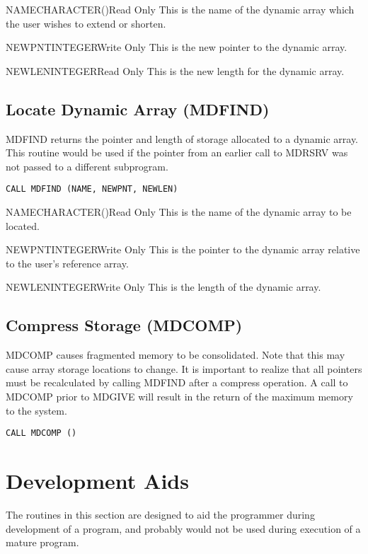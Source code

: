 \begin{argy}{NAME}{CHARACTER\last(\last)}{Read Only}
This is the name of the dynamic array which the user wishes to extend or
shorten. 
\end{argy}

\begin{argy}{NEWPNT}{INTEGER}{Write Only}
This is the new pointer to the dynamic array.
\end{argy}

\begin{argy}{NEWLEN}{INTEGER}{Read Only}
This is the new length for the dynamic array.
\end{argy}

\subsection{Locate Dynamic Array (MDFIND)}
MDFIND returns the pointer and length of storage allocated to a dynamic
array.  This routine would be used if the pointer from an earlier call to
MDRSRV was not passed to a different subprogram.

\verb+CALL MDFIND (NAME, NEWPNT, NEWLEN)+

\begin{argy}{NAME}{CHARACTER\last(\last)}{Read Only}
This is the name of the dynamic array to be located.
\end{argy}

\begin{argy}{NEWPNT}{INTEGER}{Write Only}
This is the pointer to the dynamic array relative to the user's reference
array. 
\end{argy}

\begin{argy}{NEWLEN}{INTEGER}{Write Only}
This is the length of the dynamic array.
\end{argy}

\subsection{Compress Storage (MDCOMP)}
MDCOMP causes fragmented memory to be consolidated.  Note that this may
cause array storage locations to change.  It is important to realize that
all pointers must be recalculated by calling MDFIND after a compress
operation.  A call to MDCOMP prior to MDGIVE will result in the return of
the maximum memory to the system.

\verb+CALL MDCOMP ()+


\section{Development Aids}\label{sec:mdev}
The routines in this section are designed to aid the programmer during
development of a program, and probably would not be used during execution of
a mature program.

